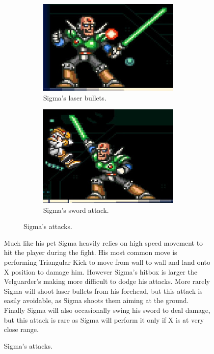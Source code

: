 \begin{figure}[htp]
\begin{figure}[htp]
	\begin{subfigure}[t]{0.43\linewidth}
		\centering
		\includegraphics[width=\linewidth]{figures/X1/Sigma_stages/Sigma_plasma.jpg}
		\caption{Sigma's laser bullets.}
	\end{subfigure}
	\begin{subfigure}[t]{0.4\linewidth}
		\centering
		\includegraphics[width=\linewidth]{figures/X1/Sigma_stages/Sigma_sword.jpg}
		\caption{Sigma's sword attack.}
	\end{subfigure}
	\caption{Sigma's attacks.}
\end{figure} 
Much like his pet Sigma heavily relies on high speed movement to hit the player during the fight. His most common move is performing Triangular Kick to move from wall to wall and land onto X position to damage him. However Sigma's hitbox is larger the Velguarder's making more difficult to dodge his attacks. More rarely Sigma will shoot laser bullets from his forehead, but this attack is easily avoidable, as Sigma shoots them aiming at the ground. Finally Sigma will also occasionally swing his sword to deal damage, but this attack is rare as Sigma will perform it only if X is at very close range.


\end{figure}
